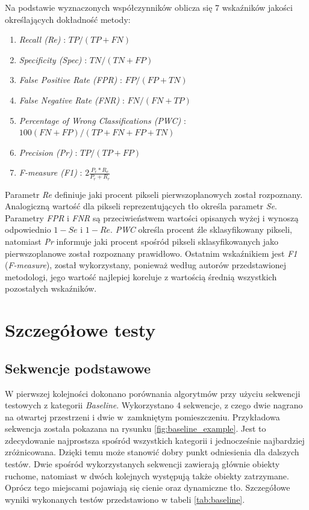 \noindent Na podstawie wyznaczonych współczynników oblicza się 7 wskaźników jakości określających dokładność metody:
%
\begin{enumerate}[nolistsep]
	\item \textit{Recall (Re)} : \tab \small{$TP/(TP+FN)$}
	\item \textit{Specificity (Spec)} : \tab \small{$TN/(TN+FP)$}
	\item \textit{False Positive Rate (FPR)} : \tab \small{$FP/(FP + TN)$}
	\item \textit{False Negative Rate (FNR)} : \tab \small{$FN/(FN + TP)$}
	\item \textit{Percentage of Wrong Classifications (PWC)} : \tab \small{$100(FN + FP)/(TP + FN + FP + TN)$}
	\item \textit{Precision (Pr)} : \tab \small{$TP/(TP + FP)$}
	\item \textit{F-measure (F1)} : \tab \small{$2\frac{P_r*R_e}{P_r+R_r}$}\\
\end{enumerate}

Parametr \textit{Re} definiuje jaki procent pikseli pierwszoplanowych został rozpoznany. 
Analogiczną wartość dla pikseli reprezentujących tło określa parametr \textit{Se}. 
Parametry \textit{FPR} i \textit{FNR} są przeciwieństwem wartości opisanych wyżej i wynoszą odpowiednio $1-Se$ i $1-Re$. 
\textit{PWC} określa procent źle sklasyfikowany pikseli, natomiast \textit{Pr} informuje jaki procent spośród pikseli sklasyfikowanych jako pierwszoplanowe został rozpoznany prawidłowo. Ostatnim wskaźnikiem jest \textit{F1} (\textit{F-measure}), został wykorzystany, ponieważ według autorów przedstawionej metodologi, jego wartość najlepiej koreluje z wartością średnią wszystkich pozostałych wskaźników.

\section{Szczegółowe testy}
\label{sec:testy}

\subsection{Sekwencje podstawowe}
\label{subsec:sewkencje_podstawowe}

W pierwszej kolejności dokonano porównania algorytmów przy użyciu sekwencji testowych z kategorii \textit{Baseline}. 
Wykorzystano 4 sekwencje, z czego dwie nagrano na otwartej przestrzeni i dwie w~zamkniętym pomieszczeniu. 
Przykładowa sekwencja została pokazana na rysunku \ref{fig:baseline_example}. 
Jest to zdecydowanie najprostsza spośród wszystkich kategorii i jednocześnie najbardziej zróżnicowana. 
Dzięki temu może stanowić dobry punkt odniesienia dla dalszych testów. 
Dwie spośród wykorzystanych sekwencji zawierają głównie obiekty ruchome, natomiast w dwóch kolejnych występują także obiekty zatrzymane. 
Oprócz tego miejscami pojawiają się cienie oraz dynamiczne tło. 
Szczegółowe wyniki wykonanych testów przedstawiono w tabeli \ref{tab:baseline}.

